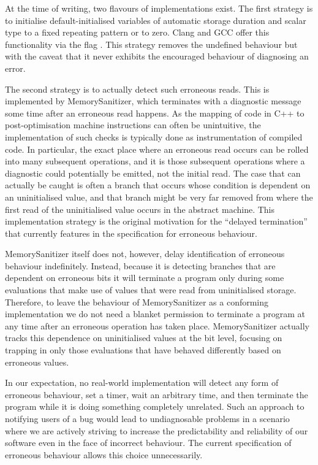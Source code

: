 At the time of writing, two flavours of \cite{P2795R5} implementations exist. The first strategy is to initialise default-initialised variables of automatic storage duration and scalar type to a fixed repeating pattern or to zero. Clang and GCC  offer this functionality via the flag \mbox{}. This strategy removes the undefined behaviour but with the caveat that it never exhibits the encouraged behaviour of diagnosing an error.

The second strategy is to actually detect such erroneous reads. This is implemented by MemorySanitizer, which terminates with a diagnostic message some time after an erroneous read happens.
As the mapping of code in C++ to  post-optimisation machine instructions can often be unintuitive, the implementation  of such checks is typically done as instrumentation of compiled code.  In particular, the exact place where an erroneous read occurs can be rolled into many subsequent operations, and it is those subsequent operations where a diagnostic could potentially be emitted, not the initial read.  The case that can actually be caught is often a branch that occurs whose condition is dependent on an uninitialised value, and that branch might be very far removed from where the first read of the uninitialised value occurs in the abstract machine. This implementation strategy is the original motivation for the ``delayed termination'' that currently features in the specification for erroneous behaviour.

MemorySanitizer itself does not, however, delay identification of erroneous behaviour indefinitely.  Instead, because it is detecting branches that are dependent on erroneous bits it will terminate a program only during some evaluations that make use of values that were read from uninitialised storage.   Therefore, to leave the behaviour of MemorySanitizer as a conforming implementation we do not need a blanket permission to terminate a program at any time after an erroneous operation has taken place.  MemorySanitizer actually tracks this dependence on uninitialised values at the bit level, focusing on trapping in only those evaluations that have behaved differently based on erroneous values.

In our expectation, no real-world implementation will detect any form of erroneous behaviour, set a timer, wait an arbitrary time, and then terminate the program while it is doing something completely unrelated.  Such an approach to notifying users of a bug would lead to undiagnosable problems in a scenario where we are actively striving to increase the predictability and reliability of our software even in the face of incorrect behaviour.   The current specification of erroneous behaviour allows this choice unnecessarily.

